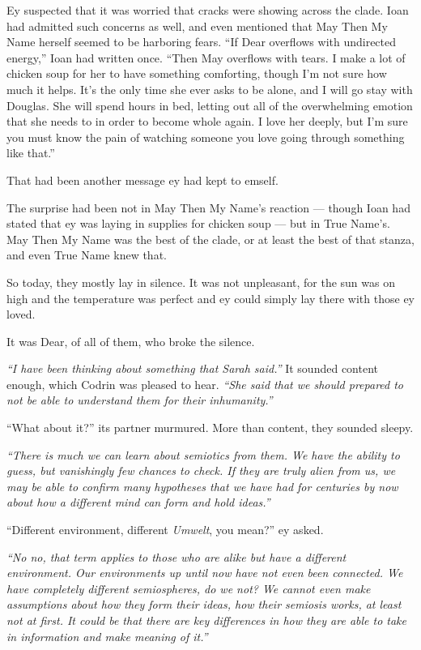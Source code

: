 Ey suspected that it was worried that cracks were showing across the clade. Ioan had admitted such concerns as well, and even mentioned that May Then My Name herself seemed to be harboring fears. ``If Dear overflows with undirected energy,'' Ioan had written once. ``Then May overflows with tears. I make a lot of chicken soup for her to have something comforting, though I'm not sure how much it helps. It's the only time she ever asks to be alone, and I will go stay with Douglas. She will spend hours in bed, letting out all of the overwhelming emotion that she needs to in order to become whole again. I love her deeply, but I'm sure you must know the pain of watching someone you love going through something like that.''

That had been another message ey had kept to emself.

The surprise had been not in May Then My Name's reaction — though Ioan had stated that ey was laying in supplies for chicken soup — but in True Name's. May Then My Name was the best of the clade, or at least the best of that stanza, and even True Name knew that.

So today, they mostly lay in silence. It was not unpleasant, for the sun was on high and the temperature was perfect and ey could simply lay there with those ey loved.

It was Dear, of all of them, who broke the silence.

\emph{``I have been thinking about something that Sarah said.''} It sounded content enough, which Codrin was pleased to hear. \emph{``She said that we should prepared to not be able to understand them for their inhumanity.''}

``What about it?'' its partner murmured. More than content, they sounded sleepy.

\emph{``There is much we can learn about semiotics from them. We have the ability to guess, but vanishingly few chances to check. If they are truly alien from us, we may be able to confirm many hypotheses that we have had for centuries by now about how a different mind can form and hold ideas.''}

``Different environment, different \emph{Umwelt}, you mean?'' ey asked.

\emph{``No no, that term applies to those who are alike but have a different environment. Our environments up until now have not even been connected. We have completely different semiospheres, do we not? We cannot even make assumptions about how they form their ideas, how their semiosis works, at least not at first. It could be that there are key differences in how they are able to take in information and make meaning of it.''}


